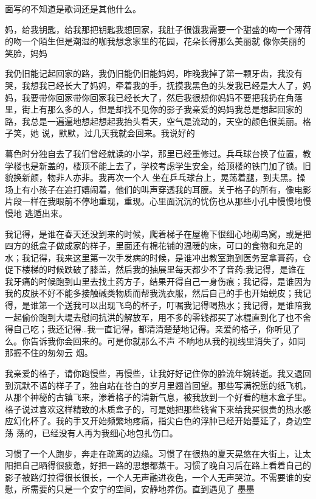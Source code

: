 \documentclass{article}
\begin{document}
面写的不知道是歌词还是其他什么。 

妈，给我钥匙，给我那把钥匙我想回家，我肚子很饿我需要一个甜盛的吻一个薄荷的吻一个陌生但是潮湿的咖我想念家里的花园，花朵长得那么美丽就
像你美丽的笑脸，妈妈 

我仍旧能记起回家的路，我仍旧能仍旧能妈妈，昨晚我掉了第一颗牙齿，我没有哭，我想我已经长大了妈妈，牵着我的手，抚摸我黑色的头发我已经是大人了，妈妈，我要带你回家带你回家我已经长大了，然后我很想你妈妈不要把我扔在角落里，街上有那么多的人，但是却找不见你的影子我亲爱的妈妈我总是想起回家的路，我总是一遍遍地想起想起我抬头看天，空气是流动的，天空的颜色很美丽。格子笑，她
说，默默，过几天我就会回来。我说好的 

暮色时分独自去了我们曾经就读的小学，那里已经重修过。兵乓球台换了位置，教学楼也是新盖的，楼顶不能上去了，学校考虑学生安全，给顶楼的铁门加了锁。旧貌换新颜，物非人亦非。我再次一个人
\newpage
坐在乒乓球台上，晃荡着腿，到夫黑。操场上有小孩子在追打嬉闹着，他们的叫声穿透我的耳膜。关于格子的所有，像电影片段一样在我眼前不停地重现，重现。心里面沉沉的忧伤也从那些小孔中慢慢地慢慢地
逃遁出来。 

我记得，是谁在春天还没到来的时候，爬着梯子在屋檐下很细心地砌鸟窝，或是把四方的纸盒子做成家的样子，里面还有棉花铺的温暖的床，可口的食物和充足的水；我记得，我来这里第一次手发病的时候，是谁冲出教室跑到医务室拿膏药，仓促下楼梯的时候跌破了膝盖，然后我的抽展里每天都少不了音药:我记得，是谁在我牙痛的时候跑到山里去找土药方子，结果开得自己一身伤痕；我记得，是谁因为我的皮肤不好不能多接触碱类物质而帮我洗衣服，然后自己的手也开始蜕皮；我记得，是谁第一个送我可以出现飞鸟的杯子，叮嘱我记得喝热水；我记得，是谁陪我一起偷价跑到大堤去慰问抗洪的解放军，用不多的零钱都买了冰棍直到化了也不舍得自己吃；我还记得…我一直记得，都清清楚楚地记得。亲爱的格子，你听见了么。你告诉我你会回来的。可是你就那么不声
\newpage
不响地从我的视线里消失了，如同那握不住的匆匆云
烟。 

我亲爱的格子，请你跑慢些，再慢些，让我好好记住你的脸流年婉转逝。我又退回到沉默不语的样子了，独自站在苍白的岁月里翘首回望。那些写满祝愿的纸飞机，从那个神秘的古镇飞来，渗着格子的清新气息，被我放到一个好看的檀木盒子里。格子说过喜欢这样精致的木质盒子的，可是她把那些钱省下来给我买很贵的热水感应幻化杯了。我的手又开始频繁地疼痛，指尖白色的浮肿已经开始蔓延了，身边空荡
荡的，已经没有人再为我细心地包扎伤口。 

习惯了一个人跑步，奔走在疏离的边缘。习惯了在很热的夏天晃悠在大街上，让太阳把自己晒得很疲惫，好把一路的思想都蒸干。习惯了晚自习后在路上看着自己的影子被路灯拉得很长很长，一个人无声融进夜色，一个人无声哭泣。不需要谁的安慰，所需要的只是一个安宁的空间，安静地养伤。直到遇见了
墨墨 
\end{document}
